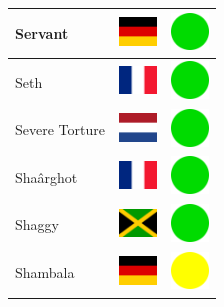 \documentclass[12pt, a4paper, twoside]{report}
\begin{document}
\begin{center}
\begin{longtable}{|p{5cm}|p{2cm}|p{2cm}|}
 Servant                                                    & \includegraphics[width=1cm]{../4x3/de} &   \includegraphics[width=1cm]{../likes/y} \\ \hline
 Seth                                                       & \includegraphics[width=1cm]{../4x3/fr} &   \includegraphics[width=1cm]{../likes/y} \\ \hline
 Severe Torture                                             & \includegraphics[width=1cm]{../4x3/nl} &   \includegraphics[width=1cm]{../likes/y} \\ \hline
 Shaârghot                                                  & \includegraphics[width=1cm]{../4x3/fr} &   \includegraphics[width=1cm]{../likes/y} \\ \hline
 Shaggy                                                     & \includegraphics[width=1cm]{../4x3/jm} &   \includegraphics[width=1cm]{../likes/y} \\ \hline
 Shambala                                                   & \includegraphics[width=1cm]{../4x3/de} &   \includegraphics[width=1cm]{../likes/m} \\ \hline

\end{longtable}
\end{center}
\end{document}
